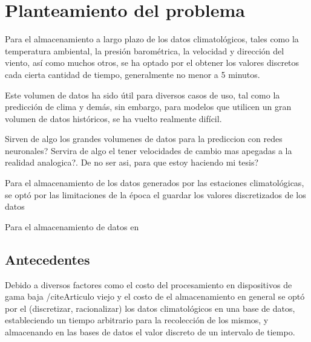 \section{Planteamiento del problema}

Para el almacenamiento a largo plazo de los datos climatológicos, tales como la temperatura ambiental, la presión barométrica, la velocidad y dirección del viento, así como muchos otros, se ha optado por el obtener los valores discretos cada cierta cantidad de tiempo, generalmente no menor a 5 minutos. %

Este volumen de datos ha sido útil para diversos casos de uso, tal como la predicción de clima y demás, sin embargo, para modelos que utilicen un gran volumen de datos históricos, se ha vuelto realmente difícil.



Sirven de algo los grandes volumenes de datos para la prediccion con redes neuronales? Servira de algo el tener velocidades de cambio mas apegadas a la realidad analogica?. De no ser asi, para que estoy haciendo mi tesis?



Para el almacenamiento de los datos generados por las estaciones climatológicas, se optó por las limitaciones de la época el guardar los valores discretizados de los datos \cite{Marshall_1994}

Para el almacenamiento de datos en

\subsection{Antecedentes}

Debido a diversos factores como el costo del procesamiento en dispositivos de gama baja /cite{Articulo viejo} y el costo de el almacenamiento en general \cite{Marshall_1994} se optó por el (discretizar, racionalizar) los datos climatológicos en una base de datos, estableciendo un tiempo arbitrario para la recolección de los mismos, y almacenando en las bases de datos el valor discreto de un intervalo de tiempo.

